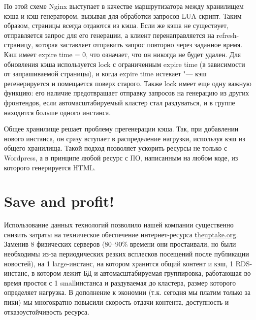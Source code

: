 \documentclass[10pt, a5paper]{article}
\begin{document}
\begin{figure}[ht]
\label{pic:kraev}
\end{figure}

По этой схеме Nginx выступает в качестве маршрутизатора между хранилищем кэша и кэш-генератором, вызывая для обработки запросов LUA-скрипт. Таким образом, страницы всегда отдаются из кэша. Если же кэша не существует, отправляется запрос для его генерации, а клиент перенаправляется на refresh-страницу, которая заставляет отправить запрос повторно через заданное время. Кэш имеет expire time = 0, что означает,  что он никогда не будет удален. Для обновления кэша используется lock с ограниченным expire time (в зависимости от запрашиваемой страницы), и когда expire time истекает "--- кэш регенерируется и помещается поверх старого. Также lock имеет еще одну важную функцию: его наличие предотвращает отправку запросов на генерацию из других фронтендов, если  автомасштабируемый кластер стал раздуваться, и в группе находится больше одного инстанса. 

Общее хранилище решает проблему прегенерации кэша. Так, при добавлении нового инстанса, он сразу вступает в распределение нагрузки, используя кэш из общего хранилища.  Такой подход позволяет ускорить ресурсы не только с Wordpress, а в принципе любой ресурс с ПО, написанным на любом коде, из которого генерируется HTML.

\section*{Save and profit!}

Использование данных технологий позволило нашей компании существенно снизить затраты на техническое обеспечение интернет-ресурса \url{theuptake.org}. Заменив 8 физических серверов (80--90\% времени они простаивали, но были необходимы из-за периодических резких всплесков посещений после публикации новостей), на 1 large-инстанс, на котором хранится общий контент и кэш, 1 RDS-инстанс, в котором лежит БД и автомасштабируемая группировка, работающая во время простоя с 1 smallинстанса и раздуваемая до кластера, размер которого определяет нагрузка. В дополнение к экономии (т.к. сегодня мы платим только за пики) мы многократно повысили скорость отдачи контента,  доступность и отказоустойчивость ресурса. 
\end{document}
